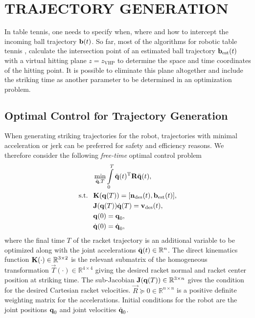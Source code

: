\section{TRAJECTORY GENERATION}\label{method}

In table tennis, one needs to specify when, where and how to intercept the incoming ball trajectory $\boldsymbol{\mathrm{b}}(t)$. So far, most of the algorithms for robotic table tennis \cite{Matsushima05}, \cite{Muelling13} calculate the intersection point of an estimated ball trajectory $\boldsymbol{\mathrm{b}}_{\mathrm{est}}(t)$ with a virtual hitting plane $z = z_{\mathrm{VHP}}$ to determine the space and time coordinates of the hitting point. It is possible to eliminate this plane altogether and include the striking time as another parameter to be determined in an optimization problem.

\subsection{Optimal Control for Trajectory Generation}

When generating striking trajectories for the robot, trajectories with minimal acceleration or jerk can be preferred for safety and efficiency reasons. We therefore consider the following \emph{free-time} optimal control problem~\cite{Liberzon11}
%
\begin{align}
&\min_{\ddot{\boldsymbol{\mathrm{q}}},T} \int\limits_{0}^{T}\ddot{\boldsymbol{\mathrm{q}}}(t)^{\mathrm{T}}\boldsymbol{\mathrm{R}}\ddot{\boldsymbol{\mathrm{q}}}(t), \label{costFnc1} \\
\textrm{s.t. \ } & \boldsymbol{\mathrm{K}}(\boldsymbol{\mathrm{q}}(T)) = [\boldsymbol{\mathrm{n}}_{\mathrm{des}}(t),\boldsymbol{\mathrm{b}}_{\mathrm{est}}(t)], \label{transCond1}\\
&\boldsymbol{\mathrm{J}}(\boldsymbol{\mathrm{q}}(T))\dot{\boldsymbol{\mathrm{q}}}(T) = \boldsymbol{\mathrm{v}}_{\mathrm{des}}(t), \label{transCond2} \\
&\boldsymbol{\mathrm{q}}(0) = \boldsymbol{\mathrm{q}}_{0}, \label{initCond1} \\
&\dot{\boldsymbol{\mathrm{q}}}(0) = \dot{\boldsymbol{\mathrm{q}}}_{0}, \label{initCond2}
\end{align}
%
\noindent where the final time $T$ of the racket trajectory is an additional variable to be optimized along with the joint accelerations $\ddot{\boldsymbol{\mathrm{q}}}(t) \in \mathbb{R}^{n}$. The direct kinematics function $\boldsymbol{\mathrm{K}}(\cdot)  \in \mathbb{R}^{3 \times 2}$ is the relevant submatrix of the homogeneous transformation $\vec{T}(\cdot) \in \mathbb{R}^{4 \times 4}$ giving the desired racket normal and racket center position at striking time. The sub-Jacobian $\boldsymbol{\mathrm{J}}(\boldsymbol{\mathrm{q}}(T)) \in \mathbb{R}^{3 \times n}$ gives the condition for the desired Cartesian racket velocities. $\vec{R} \succeq 0 \in \mathbb{R}^{n \times n}$ is a positive definite weighting matrix for the accelerations. Initial conditions for the robot are the joint positions $\boldsymbol{\mathrm{q}}_0$ and joint velocities $\dot{\boldsymbol{\mathrm{q}}}_0$.

